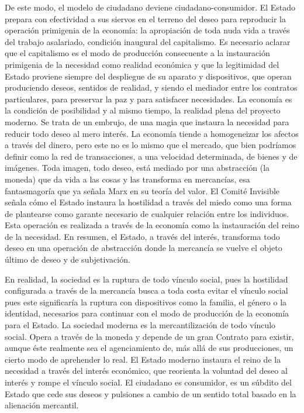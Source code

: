 De este modo, el modelo de ciudadano deviene ciudadano-consumidor. El Estado prepara con efectividad a sus siervos en el terreno del deseo para reproducir la operación primigenia de la economía: la apropiación de toda nuda vida a través del trabajo asalariado, condición inaugural del capitalismo. Es necesario aclarar que el capitalismo es el modo de producción consecuente a la instauración primigenia de la necesidad como realidad económica y que la legitimidad del Estado proviene siempre del despliegue de su aparato y dispositivos, que operan produciendo deseos, sentidos de realidad, y siendo el mediador entre los contratos particulares, para preservar la paz y para satisfacer necesidades. La economía es la condición de posibilidad y al mismo tiempo, la realidad plena del proyecto moderno. Se trata de un embrujo, de una magia que instaura la necesidad para reducir todo deseo al mero interés. La economía tiende a homogeneizar los afectos a través del dinero, pero este no es lo mismo que el mercado, que bien podríamos definir como la red de transacciones, a una velocidad determinada, de bienes y de imágenes. Toda imagen, todo deseo, está mediado por una abstracción (la moneda) que da vida a las cosas y las transforma en mercancías, esa fantasmagoría que ya señala Marx en su teoría del valor. El Comité Invisible señala cómo el Estado instaura la hostilidad a través del miedo como una forma de plantearse como garante necesario de cualquier relación entre los individuos. Esta operación es realizada a través de la economía como la instauración del reino de la necesidad. En resumen, el Estado, a través del interés, transforma todo deseo en una operación de abstracción donde la mercancía se vuelve el objeto último de deseo y de subjetivación.

En realidad, la sociedad es la ruptura de todo vínculo social, pues la hostilidad configurada a través de la mercancía busca a toda costa evitar el vínculo social pues este significaría la ruptura con dispositivos como la familia, el género o la identidad, necesarios para continuar con el modo de producción de la economía para el Estado. La sociedad moderna es la mercantilización de todo vínculo social. Opera a través de la moneda y depende de un gran Contrato para existir, aunque éste realmente sea el agenciamiento de, más allá de sus producciones, un cierto modo de aprehender lo real. El Estado moderno instaura el reino de la necesidad a través del interés económico, que reorienta la voluntad del deseo al interés y rompe el vínculo social. El ciudadano es consumidor, es un súbdito del Estado que cede sus deseos y pulsiones a cambio de un sentido total basado en la alienación mercantil.

